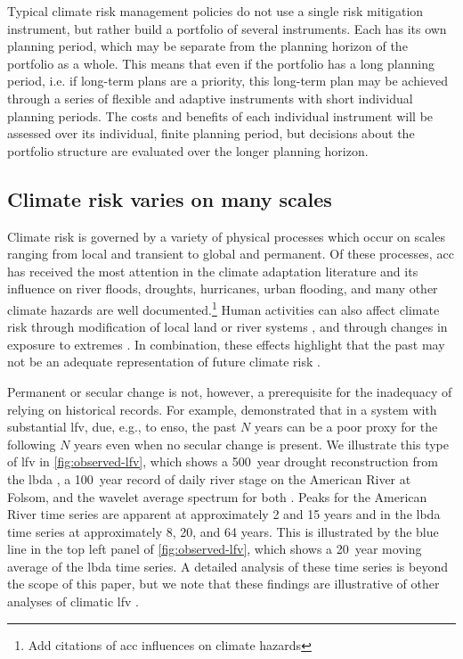 \documentclass[
]{agujournal2018}
\makeatletter
\newcommand{\eg}{e.g.\@\xspace}
\newcommand{\ie}{i.e.\@\xspace}
\makeatother
\begin{document}
Typical climate risk management policies do not use a single risk mitigation instrument, but rather build a portfolio of several instruments.
Each has its own planning period, which may be separate from the planning horizon of the portfolio as a whole.
This means that even if the portfolio has a long planning period, \ie if long-term plans are a priority, this long-term plan may be achieved through a series of flexible and adaptive instruments with short individual planning periods.
The costs and benefits of each individual instrument will be assessed over its individual, finite planning period, but decisions about the portfolio structure are evaluated over the longer planning horizon.

\subsection{Climate risk varies on many scales}\label{sec:intro-lfv}

Climate risk is governed by a variety of physical processes which occur on scales ranging from local and transient to global and permanent.
Of these processes, \gls{acc} has received the most attention in the climate adaptation literature and its influence on river floods, droughts, hurricanes, urban flooding, and many other climate hazards are well documented.\footnote{Add citations of \gls{acc} influences on climate hazards}
Human activities can also affect climate risk through modification of local land or river systems \citep[see][]{Merz:2014gf}, and through changes in exposure to extremes \citep{baldassarre:2018,Jongman:2012cr}.
In combination, these effects highlight that the past may not be an adequate representation of future climate risk \citep[termed ``nonstationarity'' by][]{Milly:2008dg}.

Permanent or secular change is not, however, a prerequisite for the inadequacy of relying on historical records.
For example, \citet{Jain:2001hz} demonstrated that in a system with substantial \acrfull{lfv}, due, \eg, to \gls{enso}, the past $N$ years can be a poor proxy for the following $N$ years even when no secular change is present.
We illustrate this type of \gls{lfv} in \cref{fig:observed-lfv}, which shows a \SI{500}{year} drought reconstruction from the \gls{lbda} \citep{Cook:2010bz}, a \SI{100}{year} record of daily river stage on the American River at Folsom, and the wavelet average spectrum for both \citep{Torrence:1998jp,Roesch:wlBQQoIs}.
Peaks for the American River time series are apparent at approximately 2 and 15 years and in the \gls{lbda} time series at approximately 8, 20, and 64 years.
This is illustrated by the blue line in the top left panel of \cref{fig:observed-lfv}, which shows a \SI{20}{year} moving average of the \gls{lbda} time series.
A detailed analysis of these time series is beyond the scope of this paper, but we note that these findings are illustrative of other analyses of climatic \gls{lfv} \citep{Jain:2001hz,Kiem:2002kq,Cook:2010bz,Swierczynski:2012km,Woollings:2014kd,Hodgkins:2017hw,Cassou:2018cs}.
\end{document}
